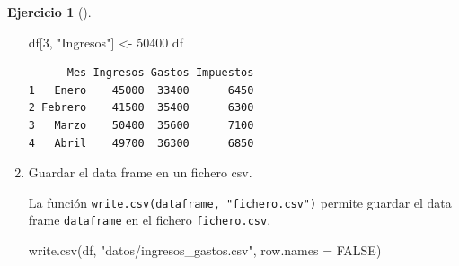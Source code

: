\documentclass[
  spanish,
  a4paper,
]{scrreport}
\newenvironment{Shaded}{\begin{snugshade}}{\end{snugshade}}
\newcommand{\AttributeTok}[1]{\textcolor[rgb]{0.40,0.45,0.13}{#1}}
\newcommand{\ConstantTok}[1]{\textcolor[rgb]{0.56,0.35,0.01}{#1}}
\newcommand{\DecValTok}[1]{\textcolor[rgb]{0.68,0.00,0.00}{#1}}
\newcommand{\FunctionTok}[1]{\textcolor[rgb]{0.28,0.35,0.67}{#1}}
\newcommand{\NormalTok}[1]{\textcolor[rgb]{0.00,0.23,0.31}{#1}}
\newcommand{\OtherTok}[1]{\textcolor[rgb]{0.00,0.23,0.31}{#1}}
\newcommand{\StringTok}[1]{\textcolor[rgb]{0.13,0.47,0.30}{#1}}
\theoremstyle{definition}
\newtheorem{exercise}{Ejercicio}[chapter]
\theoremstyle{remark}
\begin{document}
\begin{exercise}[]
\begin{enumerate}
\begin{tcolorbox}
\begin{Shaded}
\begin{Highlighting}[]
\NormalTok{df[}\DecValTok{3}\NormalTok{, }\StringTok{"Ingresos"}\NormalTok{] }\OtherTok{\textless{}{-}} \DecValTok{50400}
\NormalTok{df}
\end{Highlighting}
\end{Shaded}

\begin{verbatim}
      Mes Ingresos Gastos Impuestos
1   Enero    45000  33400      6450
2 Febrero    41500  35400      6300
3   Marzo    50400  35600      7100
4   Abril    49700  36300      6850
\end{verbatim}

  \end{tcolorbox}
\item
  Guardar el data frame en un fichero csv.

  \begin{tcolorbox}[enhanced jigsaw, colback=white, opacityback=0, title=\textcolor{quarto-callout-tip-color}{\faLightbulb}\hspace{0.5em}{Solución}, toprule=.15mm, titlerule=0mm, breakable, toptitle=1mm, colframe=quarto-callout-tip-color-frame, coltitle=black, opacitybacktitle=0.6, bottomrule=.15mm, arc=.35mm, colbacktitle=quarto-callout-tip-color!10!white, leftrule=.75mm, bottomtitle=1mm, rightrule=.15mm, left=2mm]

  La función \texttt{write.csv(dataframe,\ "fichero.csv")} permite
  guardar el data frame \texttt{dataframe} en el fichero
  \texttt{fichero.csv}.

\begin{Shaded}
\begin{Highlighting}[]
\FunctionTok{write.csv}\NormalTok{(df, }\StringTok{"datos/ingresos\_gastos.csv"}\NormalTok{, }\AttributeTok{row.names =} \ConstantTok{FALSE}\NormalTok{)}
\end{Highlighting}
\end{Shaded}

  \end{tcolorbox}
\end{enumerate}

\end{exercise}
\end{document}
